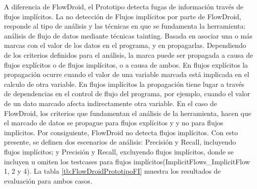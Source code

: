 A diferencia de FlowDroid, el Prototipo detecta fugas de información través de
flujos implícitos. La no detección de Flujos implícitos por parte de FlowDroid,
responde al tipo de análisis y las técnicas en que se fundamenta la herramienta:
análisis de flujo de datos mediante técnicas tainting. Basada en 
% 
% 
asociar una o más marcas
con el valor de los datos en el programa, y en propagarlas. Dependiendo de los
criterios definidos para el análisis, la marca puede ser propagada a causa de
flujos explícitos o de flujos implícitos, o a causa de ambos. En flujos
explícitos la propagación ocurre cuando el valor de una variable marcada está
implicada en el calculo de otra variable. En flujos implícitos la propagación
tiene lugar a través de dependencias en el control de flujo del programa, por
ejemplo, cuando el valor de un dato marcado afecta indirectamente otra variable.\newline 
En el caso de FlowDroid, los criterios que fundamentan el análisis de la
herramienta, hacen que el marcado de datos se propague para flujos explícitos y
y no para flujos implícitos. Por consiguiente, FlowDroid no detecta flujos
implícitos.\newline
Con esto presente, se definen dos escenarios de análisis: Precisión y Recall,
incluyendo flujos implícitos; y  Precisión y Recall, excluyendo flujos
implícitos, donde se incluyen u omiten los testcases para flujos
implícitos(ImplicitFlows\_ImplicitFlow 1, 2 y 4).\newline
La tabla \ref{tb:FlowDroidPrototipoFI} muestra los resultados de evaluación para
ambos casos.\newline
